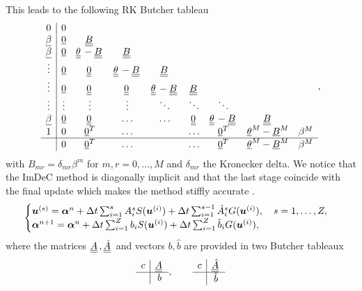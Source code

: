This leads to the following RK Butcher tableau
\begin{align}\label{eq:ImDeC_RK_ButcherTableu}
\begin{array}{c|ccccccccc}
0 & 0 &   & &  & & &  & \\
\vec{\beta} & \vec{0} & \mat{B}  &   & & & & &  \\
\vec{\beta}  & \vec{0} &   \mat{{\theta}}-\mat{B} &\mat{B} & & & & &\\
\vdots & \vec{0} & \mat{0}  &\mat{{\theta}}-\mat{B} &\mat{B}& & & &\\
\vdots & \vec{0} &  \mat{0}   &   \mat{0}  & \mat{{\theta}}-\mat{B} &\mat{B}  &  & &\\
\vdots &  \vdots  &  \vdots &  \vdots &  \ddots  &  \ddots& \ddots & & \\
\vec{\beta} & \vec{0} &  \mat{0}  &  \hdots &  \hdots & \mat{0}  &  \mat{{\theta}}-\mat{B} &\mat{B} & \\
1&  0 & \vec{0}^T    & \hdots  &   &   \hdots &    \vec{0}^T& \vec{{\theta}}^M-\vec{B}^M &\beta^M \\
\hline
&  0 & \vec{0}^T    & \hdots  &   &   \hdots &\vec{0}^T &   \vec{{\theta}}^M-\vec{B}^M &\beta^M
\end{array},
\end{align}
with $B_{mr}= \delta_{mr} \beta^m$ for $m,r=0,\dots, M$ and $\delta_{mr}$ the Kronecker delta.
We notice that the ImDeC method is diagonally implicit and that the last stage coincide with the final update which makes the method stiffly accurate \cite[Proposition 3.8]{wanner1996solving}.\\
\begin{equation}
\begin{cases}
\boldsymbol{u}^{(s)} = \boldsymbol{\alpha}^n +\Delta t \sum_{i=1}^s A_i^s S(\boldsymbol{u}^{(i)})+\Delta t \sum_{i=1}^{s-1} \hat{A}_i^s G(\boldsymbol{u}^{(i)}),\quad s=1,\dots, Z,\\
\boldsymbol{\alpha}^{n+1} = \boldsymbol{\alpha}^n +\Delta t \sum_{i=1}^Z b_i S(\boldsymbol{u}^{(i)})+\Delta t \sum_{i=1}^{Z} \hat{b}_i G(\boldsymbol{u}^{(i)}),
\end{cases}
\end{equation}
where the matrices  $\mat{A},\mat{\hat{A}}$ and vectors $b,\hat{b}$  are provided in two Butcher tableaux
\begin{equation}\label{eq:IMEX_Butcher}
\begin{array}{c|c}
c & \mat{A}\\\hline
& b
\end{array}, \qquad
\begin{array}{c|c}
c & \mat{\hat{A}}\\\hline
& \hat{b}
\end{array}
\end{equation}
